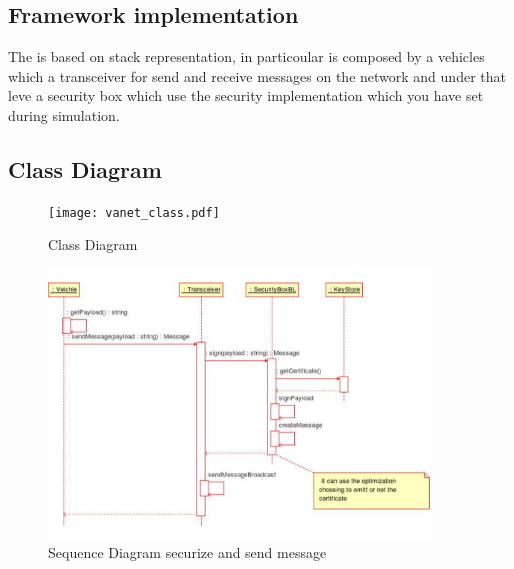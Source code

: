 \subsection{Framework implementation}
The \vs is based on stack representation, in particoular is composed by a vehicles which a transceiver for send and receive messages on the network and under that leve a security box which use the security implementation which you have set during simulation.
\subsection{Class Diagram}
\begin{figure}[ht]
\centerline{\texttt{[image: vanet\_class.pdf]}}
\caption{Class Diagram}
\label{fig:class_diagram}
\end{figure}
\begin{figure}[ht]
\centerline{\includegraphics[width=0.9\textwidth]{baseline_send_message.pdf}}
\caption{Sequence Diagram \baseline securize and send message}
\label{fig:sequence_send_baseline}
\end{figure}
